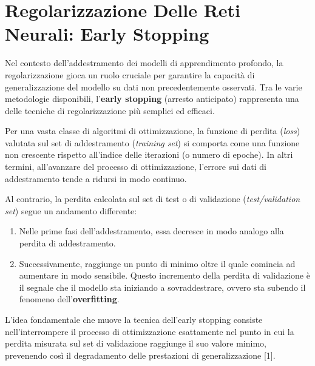 ﻿\documentclass[11pt, a4paper]{article}
\author{Francesco Lo Verde}
\begin{document}
\section{Regolarizzazione Delle Reti Neurali: Early Stopping}

Nel contesto dell'addestramento dei modelli di apprendimento profondo, la regolarizzazione gioca un ruolo cruciale per garantire la capacità di generalizzazione del modello su dati non precedentemente osservati. Tra le varie metodologie disponibili, l'\textbf{early stopping} (arresto anticipato) rappresenta una delle tecniche di regolarizzazione più semplici ed efficaci.

Per una vasta classe di algoritmi di ottimizzazione, la funzione di perdita (\emph{loss}) valutata sul set di addestramento (\emph{training set}) si comporta come una funzione non crescente rispetto all'indice delle iterazioni (o numero di epoche). In altri termini, all'avanzare del processo di ottimizzazione, l'errore sui dati di addestramento tende a ridursi in modo continuo.

Al contrario, la perdita calcolata sul set di test o di validazione (\emph{test/validation set}) segue un andamento differente:
\begin{enumerate}[noitemsep]
    \item Nelle prime fasi dell'addestramento, essa decresce in modo analogo alla perdita di addestramento.
    \item Successivamente, raggiunge un punto di minimo oltre il quale comincia ad aumentare in modo sensibile. Questo incremento della perdita di validazione è il segnale che il modello sta iniziando a sovraddestrare, ovvero sta subendo il fenomeno dell'\textbf{overfitting}.
\end{enumerate}

L'idea fondamentale che muove la tecnica dell'early stopping consiste nell'interrompere il processo di ottimizzazione esattamente nel punto in cui la perdita misurata sul set di validazione raggiunge il suo valore minimo, prevenendo così il degradamento delle prestazioni di generalizzazione [1].

\end{document}
